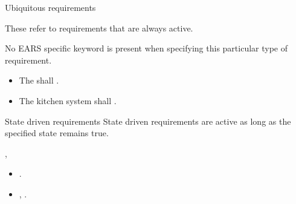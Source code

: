 \documentclass[aspectratio=169]{beamer}
\begin{document}


\begin{slide}{Ubiquitous requirements}

  These refer to requirements that are always active. 
  \begin{block}{}\centering
   
  \end{block}
  No EARS specific keyword is present when specifying this particular type of requirement.

  \begin{example}
    \begin{itemize}
      \item The {\color{red}{mobile phone}} shall {\color{blue}{have a mass of less than $x$ grams}}.
      \item The {\color{red}kitchen system} shall {\color{blue}{have an input hatch}}.
    \end{itemize}
  \end{example}
\end{slide}



\begin{slide}{State driven requirements}
  State driven requirements are active as long as the specified state remains true.
    \begin{block}{}\centering
      \ewhile[<precondition(s)>],
    \end{block}  
  
  \begin{example}
  \begin{itemize}
    \item {} \ethe[ATM] .
    \item {},  .
  \end{itemize}
  \end{example}

\end{slide}
\end{document}
